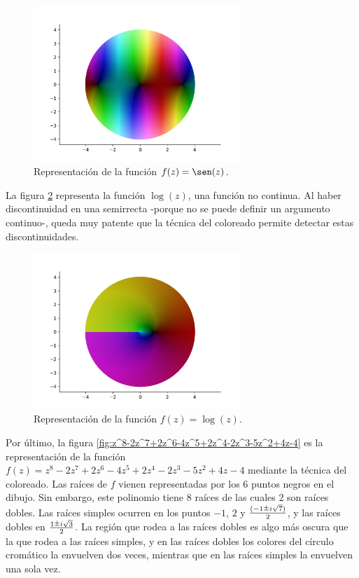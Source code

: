 \begin{figure}[!htbp]
    \centering
    \includegraphics[width=0.7\textwidth]{../Aplicacion/sen(z).png}
    \caption{Representación de la función $f(z) = \sen(z)$.}
    \label{fig:sen(z)}
\end{figure}

La figura \ref{fig:log(z)} representa la función $\log(z)$, una función no continua. Al haber discontinuidad en una semirrecta -porque no se puede definir un argumento continuo-, queda muy patente que la técnica del coloreado permite detectar estas discontinuidades. \\ %

\begin{figure}[!htbp]
    \centering
    \includegraphics[width=0.7\textwidth]{../Aplicacion/log(z).png}
    \caption{Representación de la función $f(z) = \log(z)$.}
    \label{fig:log(z)}
\end{figure}

Por último, la figura \ref{fig:z^8-2z^7+2z^6-4z^5+2z^4-2z^3-5z^2+4z-4} es la representación de la función $f(z) = z^8-2z^7+2z^6-4z^5+2z^4-2z^3-5z^2+4z-4$ mediante la técnica del coloreado. Las raíces de $f$ vienen representadas por los $6$ puntos negros en el dibujo. Sin embargo, este polinomio tiene $8$ raíces de las cuales $2$ son raíces dobles. Las raíces simples ocurren en los puntos $-1$, $2$ y $\frac{(-1 \rpm i \sqrt{7})}{2}$, y las raíces dobles en $\frac{1 \rpm i \sqrt{3}}{2}$.  La región que rodea a las raíces dobles es algo más oscura que la que rodea a las raíces simples, y en las raíces dobles los colores del círculo cromático la envuelven dos veces, mientras que en las raíces simples la envuelven una sola vez. \\


